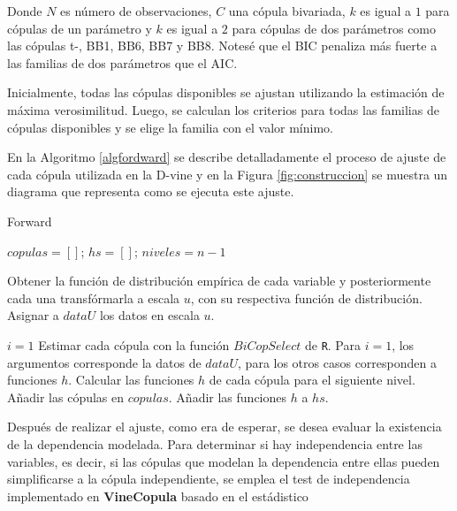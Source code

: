 Donde $N$ es número de observaciones, $C$ una cópula bivariada, $k$ es igual a $1$ para cópulas de un parámetro y $k$ es igual a $2$ para cópulas de dos parámetros como las cópulas t-, BB1, BB6, BB7 y BB8. Notesé que el BIC penaliza más fuerte a las familias de dos parámetros que el AIC.

Inicialmente, todas las cópulas disponibles se ajustan utilizando la estimación de máxima verosimilitud. Luego, se calculan los criterios para todas las familias de cópulas disponibles y se elige la familia con el valor mínimo.


En la Algoritmo \ref{algfordward} se describe detalladamente el proceso de ajuste de cada cópula utilizada en la D-vine y en la Figura \ref{fig:construccion} se muestra un diagrama que representa como se ejecuta este ajuste.

\begin{algorithm}[H]
      \caption{Forward}
      \label{algfordward}
      \begin{algorithmic}[1]  

        \State $copulas =  \left [  \right ]$; $hs =  \left [  \right ]$; $niveles = n-1$
        
        \State Obtener la función de distribución empírica de cada variable y posteriormente cada una transfórmarla a escala $u$, con su respectiva función de distribución. 
        \State Asignar a $dataU$ los datos en escala $u$.
        
        \State $i = 1$
          \State Estimar cada cópula con la función $BiCopSelect$ de \texttt{R}. Para $i = 1$, los argumentos corresponde la datos de $dataU$, para los otros casos corresponden a funciones $h$.
          \State Calcular las funciones $h$ de cada cópula para el siguiente nivel.
          \State Añadir las cópulas en $copulas$.
          \State Añadir las funciones $h$ a $hs$.
        \EndWhile
       
      \end{algorithmic}
    \end{algorithm}



Después de realizar el ajuste, como era de esperar, se desea evaluar la existencia de la dependencia modelada. Para determinar si hay independencia entre las variables, es decir, si las cópulas que modelan la dependencia entre ellas pueden simplificarse a la cópula independiente, se emplea el test de independencia implementado en \textbf{VineCopula} basado en el estádistico
    
